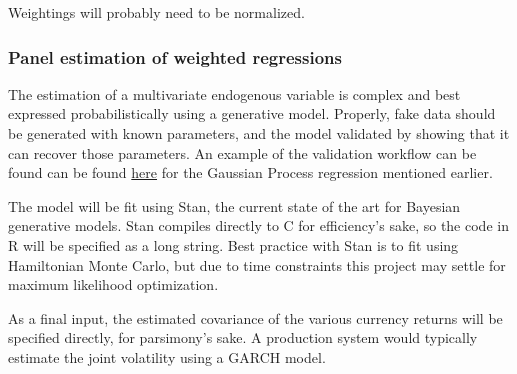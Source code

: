 \documentclass[]{article}
\begin{document}
Weightings will probably need to be normalized.

\subsubsection{Panel estimation of weighted
regressions}\label{panel-estimation-of-weighted-regressions}

The estimation of a multivariate endogenous variable is complex and best
expressed probabilistically using a generative model. Properly, fake
data should be generated with known parameters, and the model validated
by showing that it can recover those parameters. An example of the
validation workflow can be found can be found
\href{https://charlesnaylor.github.io/gp_regression/doc/Specifying_the_Model-Full_Model.html}{here}
for the Gaussian Process regression mentioned earlier.

The model will be fit using Stan, the current state of the art for
Bayesian generative models. Stan compiles directly to C for efficiency's
sake, so the code in R will be specified as a long string. Best practice
with Stan is to fit using Hamiltonian Monte Carlo, but due to time
constraints this project may settle for maximum likelihood optimization.

As a final input, the estimated covariance of the various currency
returns will be specified directly, for parsimony's sake. A production
system would typically estimate the joint volatility using a GARCH
model.
\end{document}
